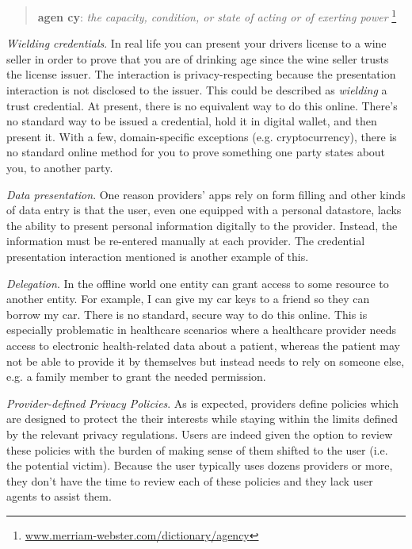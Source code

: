 \documentclass[11pt, oneside]{article}   	%
\newcommand{\hyperfootnote}[1][]{\def\ArgI{{#1}}\hyperfootnoteRelay}
\newcommand\hyperfootnoteRelay[2][]{\href{#1#2}{\ArgI}\footnote{\href{#1#2}{#2}}}
\begin{document}
\begin{quote}
\textbf{a\hspace{0.5mm}\tiny {}\normalsize \hspace{0.5mm}gen \tiny {} \normalsize cy}: \emph{the capacity, condition, or state of acting or of exerting power} \hyperfootnote[][https://]{www.merriam-webster.com/dictionary/agency}
\end{quote}

\emph{Wielding credentials}. In real life you can present your drivers license to a wine seller in order to prove that you are of drinking age since the wine seller trusts the license issuer. The interaction is privacy-respecting because the presentation interaction is not disclosed to the issuer. This could be described as \emph{wielding} a trust credential. At present, there is no equivalent way to do this online. There's no standard way to be issued a credential, hold it in digital wallet, and then present it. With a few, domain-specific exceptions (e.g. cryptocurrency), there is no standard online method for you to prove something one party states about you, to another party.

\emph{Data presentation}. One reason providers' apps rely on form filling and other kinds of data entry is that the user, even one equipped with a personal datastore, lacks the ability to present personal information digitally to the provider. Instead, the information must be re-entered manually at each provider. The credential presentation interaction mentioned is another example of this.

\emph{Delegation}. In the offline world one entity can grant access to some resource to another entity. For example, I can give my car keys to a friend so they can borrow my car. There is no standard, secure way to do this online. This is especially problematic in healthcare scenarios where a healthcare provider needs access to electronic health-related data about a patient, whereas the patient may not be able to provide it by themselves but instead needs to rely on someone else, e.g. a family member to grant the needed permission.

\emph{Provider-defined Privacy Policies}. As is expected, providers define policies which are designed to protect the their interests while staying within the limits defined by the relevant privacy regulations. Users are indeed given the option to review these policies with the burden of making sense of them shifted to the user (i.e. the potential victim). Because the user typically uses dozens providers or more, they don't have the time to review each of these policies and they lack user agents to assist them. 
\end{document}
